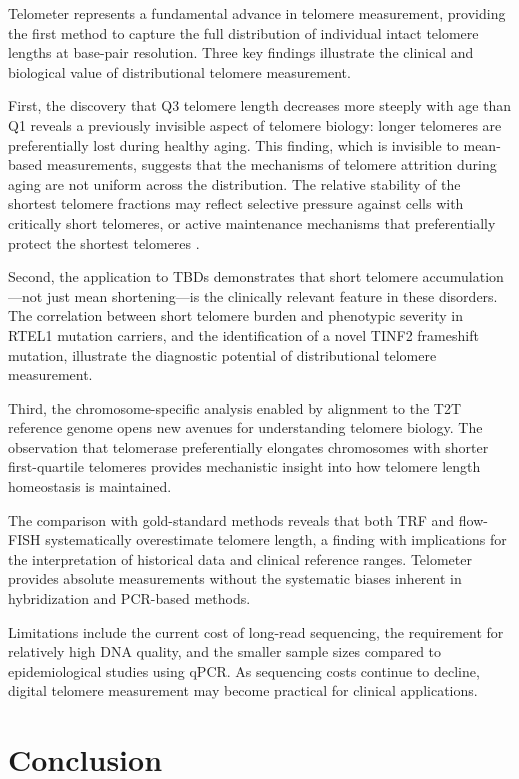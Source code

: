 \documentclass[11pt]{article}
\begin{document}
Telometer represents a fundamental advance in telomere measurement, providing the first method to capture the full distribution of individual intact telomere lengths at base-pair resolution. Three key findings illustrate the clinical and biological value of distributional telomere measurement.

First, the discovery that Q3 telomere length decreases more steeply with age than Q1 reveals a previously invisible aspect of telomere biology: longer telomeres are preferentially lost during healthy aging. This finding, which is invisible to mean-based measurements, suggests that the mechanisms of telomere attrition during aging are not uniform across the distribution. The relative stability of the shortest telomere fractions may reflect selective pressure against cells with critically short telomeres, or active maintenance mechanisms that preferentially protect the shortest telomeres \citep{blackburn2001telomere}.

Second, the application to TBDs demonstrates that short telomere accumulation---not just mean shortening---is the clinically relevant feature in these disorders. The correlation between short telomere burden and phenotypic severity in RTEL1 mutation carriers, and the identification of a novel TINF2 frameshift mutation, illustrate the diagnostic potential of distributional telomere measurement.

Third, the chromosome-specific analysis enabled by alignment to the T2T reference genome \citep{nurk2022complete} opens new avenues for understanding telomere biology. The observation that telomerase preferentially elongates chromosomes with shorter first-quartile telomeres provides mechanistic insight into how telomere length homeostasis is maintained.

The comparison with gold-standard methods reveals that both TRF and flow-FISH systematically overestimate telomere length, a finding with implications for the interpretation of historical data and clinical reference ranges. Telometer provides absolute measurements without the systematic biases inherent in hybridization and PCR-based methods.

Limitations include the current cost of long-read sequencing, the requirement for relatively high DNA quality, and the smaller sample sizes compared to epidemiological studies using qPCR. As sequencing costs continue to decline, digital telomere measurement may become practical for clinical applications.

\section{Conclusion}
\end{document}
